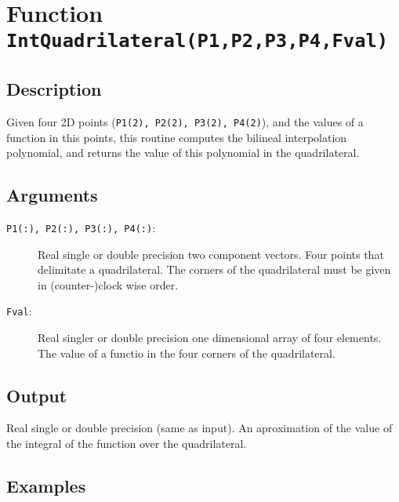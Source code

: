 \section{Function \texttt{IntQuadrilateral(P1,P2,P3,P4,Fval) }}

\subsection{Description}

Given four 2D points (\texttt{P1(2), P2(2), P3(2), P4(2)}), and the values of a
function in this points, this routine computes the bilineal
interpolation polynomial, and returns the value of this polynomial in
the quadrilateral. 

\subsection{Arguments}

\begin{description}
\item[\texttt{P1(:), P2(:), P3(:), P4(:)}:] Real single or double
  precision two component vectors. Four points that delimitate a
  quadrilateral. The corners of the quadrilateral must be given in
  (counter-)clock wise order.
\item[\texttt{Fval}:] Real singler or double precision one dimensional
  array of four elements. The value of a functio in the four corners
  of the quadrilateral.
\end{description}

\subsection{Output}

Real single or double precision (same as input). An aproximation of
the value of the integral of the function over the quadrilateral.


\subsection{Examples}

